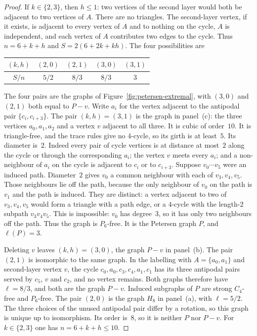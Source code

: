 \documentclass[ASNA]{USG}
\theoremstyle{WBstyletwo}
\numberwithin{equation}{section}
\newcommand{\lr}{\ell}
\begin{document}
\begin{proof}
If $k\in\{2,3\}$, then $h\le 1$: two vertices of the second layer would both be adjacent to two vertices of $A$. There are no triangles. The second-layer vertex, if it exists, is adjacent to every vertex of $A$ and to nothing on the cycle, $A$ is independent, and each vertex of $A$ contributes two edges to the cycle. Thus $n=6+k+h$ and $S=2(6+2k+kh)$. The four possibilities are
\begin{center}
\begin{tabular}{@{}ccccc@{}}
\toprule
$(k,h)$ & $(2,0)$ & $(2,1)$ & $(3,0)$ & $(3,1)$\\
\midrule
$S/n$ & $5/2$ & $8/3$ & $8/3$ & $3$\\
\bottomrule
\end{tabular}
\end{center}
The four pairs are the graphs of Figure~\ref{fig:petersen-extremal}, with $(3,0)$ and $(2,1)$ both equal to $P-v$. Write $a_i$ for the vertex adjacent to the antipodal pair $\{c_i,c_{i+3}\}$. The pair $(k,h)=(3,1)$ is the graph in panel~(c): the three vertices $a_0,a_1,a_2$ and a vertex $v$ adjacent to all three. It is cubic of order~$10$. It is triangle-free, and the trace rules give no $4$-cycle, so its girth is at least~$5$. Its diameter is~$2$. Indeed every pair of cycle vertices is at distance at most~$2$ along the cycle or through the corresponding $a_i$; the vertex $v$ meets every $a_i$; and a non-neighbour of $a_i$ on the cycle is adjacent to $c_i$ or to $c_{i+3}$. Suppose $v_0\cdots v_5$ were an induced path. Diameter~$2$ gives $v_0$ a common neighbour with each of $v_3,v_4,v_5$. Those neighbours lie off the path, because the only neighbour of $v_0$ on the path is $v_1$ and the path is induced. They are distinct: a vertex adjacent to two of $v_3,v_4,v_5$ would form a triangle with a path edge, or a $4$-cycle with the length-$2$ subpath $v_3v_4v_5$. This is impossible: $v_0$ has degree~$3$, so it has only two neighbours off the path. Thus the graph is $P_6$-free. It is the Petersen graph $P$, and $\lr(P)=3$.

Deleting $v$ leaves $(k,h)=(3,0)$, the graph $P-v$ in panel~(b). The pair $(2,1)$ is isomorphic to the same graph. In the labelling with $A=\{a_0,a_1\}$ and second-layer vertex $v$, the cycle $c_0,a_0,c_3,c_4,a_1,c_1$ has its three antipodal pairs served by $c_5$, $v$ and $c_2$, and no vertex remains. Both graphs therefore have $\lr=8/3$, and both are the graph $P-v$. Induced subgraphs of $P$ are strong $C_4$-free and $P_6$-free. The pair $(2,0)$ is the graph $H_8$ in panel~(a), with $\lr=5/2$. The three choices of the unused antipodal pair differ by a rotation, so this graph is unique up to isomorphism. Its order is~$8$, so it is neither $P$ nor $P-v$. For $k\in\{2,3\}$ one has $n=6+k+h\le 10$.


\end{proof}
\end{document}
